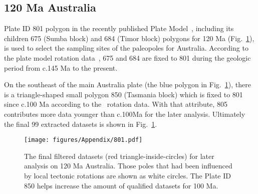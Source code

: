 \subsection{120 Ma Australia}

Plate ID 801 polygon in the recently published Plate Model~\cite{Y18}, including
its children 675 (Sumba block) and 684 (Timor block) polygons for
120 Ma (Fig.~\ref{fig_AUfinal}), is used to select the sampling
sites of the paleopoles for Australia. According to the plate model rotation
data~\cite{Y18}, 675 and 684 are fixed to 801 during the geologic period from
c.145 Ma to the present.

On the southeast of the main Australia plate (the blue polygon in
Fig.~\ref{fig_AUfinal}), there is a triangle-shaped small polygon 850
(Tasmania block) which is fixed to 801 since c.100 Ma according to
the~\cite{Y18} rotation data. With that attribute, 805 contributes more data
younger than c.100Ma for the later analysis. Ultimately the final 99 extracted
datasets is shown in Fig.~\ref{fig_AUfinal}.

\begin{figure}
\texttt{[image: figures/Appendix/801.pdf]}
\caption{The final filtered datasets (red triangle-inside-circles) for later
analysis on 120 Ma Australia. Those poles that had been influenced
by local tectonic rotations are shown as white circles. The Plate ID 850 helps
increase the amount of qualified datasets for 100
Ma.}\label{fig_AUfinal}
\end{figure}~\label{lastpage}
